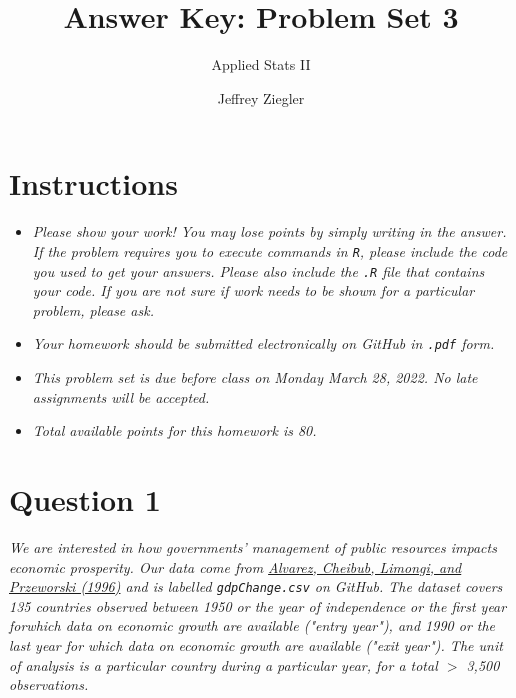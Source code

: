 \documentclass[12pt,letterpaper]{article}
\title{Answer Key: Problem Set 3}
\date{Jeffrey Ziegler}
\author{Applied Stats II}
\begin{document}
	\maketitle
	
	\section*{Instructions}
	\begin{itemize}
		\item \textit{Please show your work! You may lose points by simply writing in the answer. If the problem requires you to execute commands in \texttt{R}, please include the code you used to get your answers. Please also include the \texttt{.R} file that contains your code. If you are not sure if work needs to be shown for a particular problem, please ask.}
		\item \textit{Your homework should be submitted electronically on GitHub in \texttt{.pdf} form.}
		\item \textit{This problem set is due before class on Monday March 28, 2022. No late assignments will be accepted.}
		\item \textit{Total available points for this homework is 80.}
	\end{itemize}
	\vspace{.25cm}
	
	\section*{Question 1}
	\vspace{.25cm}
\noindent \emph{We are interested in how governments' management of public resources impacts economic prosperity. Our data come from \href{https://www.researchgate.net/profile/Adam_Przeworski/publication/240357392_Classifying_Political_Regimes/links/0deec532194849aefa000000/Classifying-Political-Regimes.pdf}{Alvarez, Cheibub, Limongi, and Przeworski (1996)} and is labelled \texttt{gdpChange.csv} on GitHub. The dataset covers 135 countries observed between 1950 or the year of independence or the first year forwhich data on economic growth are available ("entry year"), and 1990 or the last year for which data on economic growth are available ("exit year"). The unit of analysis is a particular country during a particular year, for a total $>$ 3,500 observations. }
\end{document}
